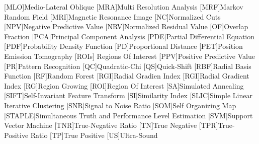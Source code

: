 \begin{acronym}
[MLO]{Medio-Lateral Oblique}
[MRA]{Multi Resolution Analysis}
[MRF]{Markov Random Field}
[MRI]{Magnetic Resonance Image}
[NC]{Normalized Cuts}
[NPV]{Negative Predictive Value}
[NRV]{Normalized Residual Value}
[OF]{Overlap Fraction}
[PCA]{Principal Component Analysis}
[PDE]{Partial Differential Equation}
[PDF]{Probability Density Function}
[PD]{Proportional Distance}
[PET]{Position Emission Tomography}
[ROIs]{ Regions Of Interest}
[PPV]{Positive Predictive Value}
[PR]{Pattern Recognition}
[QC]{Quadratic-Chi}
[QS]{Quick-Shift}
[RBF]{Radial Basis Function}
[RF]{Random Forest}
[RGI]{Radial Gradien Index}
[RGI]{Radial Gradient Index}
[RG]{Region Growing}
[ROI]{Region Of Interest}
[SA]{Simulated Annealing}
[SIFT]{Self-Invariant Feature Transform}
[SI]{Similarity Index}
[SLIC]{Simple Linear Iterative Clustering}
[SNR]{Signal to Noise Ratio}
[SOM]{Self Organizing Map}
[STAPLE]{Simultaneous Truth and Performance Level Estimation}
[SVM]{Support Vector Machine}
[TNR]{True-Negative Ratio}
[TN]{True Negative}
[TPR]{True-Positive Ratio}
[TP]{True Positive}
[US]{Ultra-Sound}
\end{acronym}
